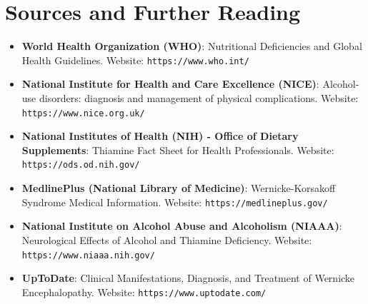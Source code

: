 \section*{Sources and Further Reading}
\begin{itemize}
    \item \textbf{World Health Organization (WHO)}: Nutritional Deficiencies and Global Health Guidelines. Website: \texttt{https://www.who.int/}
    \item \textbf{National Institute for Health and Care Excellence (NICE)}: Alcohol-use disorders: diagnosis and management of physical complications. Website: \texttt{https://www.nice.org.uk/}
    \item \textbf{National Institutes of Health (NIH) - Office of Dietary Supplements}: Thiamine Fact Sheet for Health Professionals. Website: \texttt{https://ods.od.nih.gov/}
    \item \textbf{MedlinePlus (National Library of Medicine)}: Wernicke-Korsakoff Syndrome Medical Information. Website: \texttt{https://medlineplus.gov/}
    \item \textbf{National Institute on Alcohol Abuse and Alcoholism (NIAAA)}: Neurological Effects of Alcohol and Thiamine Deficiency. Website: \texttt{https://www.niaaa.nih.gov/}
    \item \textbf{UpToDate}: Clinical Manifestations, Diagnosis, and Treatment of Wernicke Encephalopathy. Website: \texttt{https://www.uptodate.com/}
\end{itemize}
